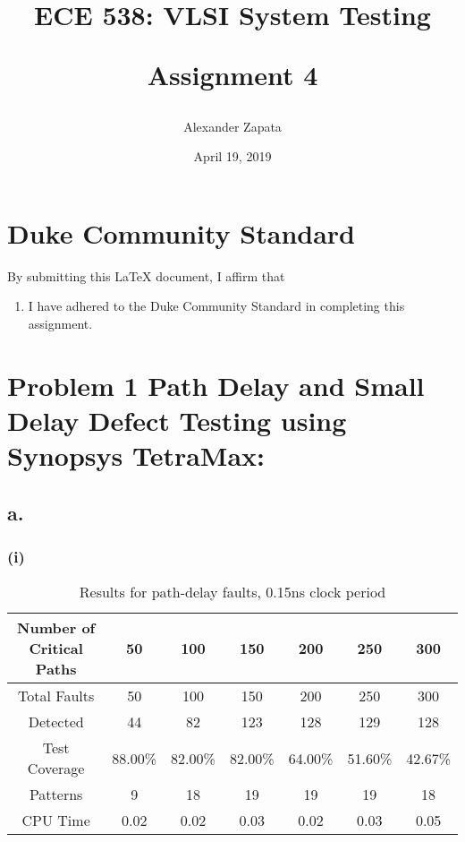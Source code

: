 \documentclass[letterpaper]{article} %
\begin{document}
\title{ECE 538: VLSI System Testing\\
\begin{large}{Assignment 4}\end{large}
\date{April 19, 2019}} %
\author{Alexander Zapata}
\maketitle


\vspace{12.0cm}
\section*{Duke Community Standard}

By submitting this \LaTeX{} document, I affirm that
\begin{enumerate}
    \item I have adhered to the Duke Community Standard in completing this assignment.
\end{enumerate}

\newpage 

\section*{Problem 1 {\small Path	Delay	and	Small	Delay	Defect	Testing	using	Synopsys	TetraMax:}}
\subsection*{a.}
\subsubsection*{(i)}
\begin{table}[ht]
\begin{tabular}{|c|c|c|c|c|c|c|}
\hline
Number of Critical Paths & 50      & 100     & 150     & 200     & 250     & 300     \\ \hline
Total Faults             & 50      & 100     & 150     & 200     & 250     & 300     \\ \hline
Detected                 & 44      & 82      & 123     & 128     & 129     & 128     \\ \hline
Test Coverage            & 88.00\% & 82.00\% & 82.00\% & 64.00\% & 51.60\% & 42.67\% \\ \hline
Patterns                 & 9       & 18      & 19      & 19      & 19      & 18      \\ \hline
CPU Time                 & 0.02    & 0.02    & 0.03    & 0.02    & 0.03    & 0.05    \\ \hline
\end{tabular}
\caption{Results for path-delay faults, 0.15ns clock period}
\end{table}
\end{document}
